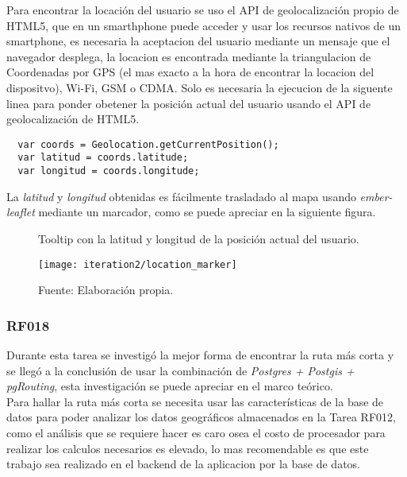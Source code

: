 Para encontrar la locación del usuario se uso el API de geolocalización propio de HTML5, que en un smarthphone puede acceder y usar los recursos nativos de un smartphone, es necesaria la aceptacion del usuario mediante un mensaje que el navegador desplega, la locacion es encontrada mediante la triangulacion de Coordenadas por GPS (el mas exacto a la hora de encontrar la locacion del dispositvo), Wi-Fi, GSM o CDMA. Solo es necesaria la ejecucion de la siguente linea para ponder obetener la posición actual del usuario usando el API de geolocalización de HTML5.

\begin{verbatim}
  var coords = Geolocation.getCurrentPosition();
  var latitud = coords.latitude;
  var longitud = coords.longitude;
\end{verbatim}

La \emph{latitud} y \emph{longitud} obtenidas es fácilmente trasladado al mapa usando \emph{ember-leaflet} mediante un marcador, como se puede apreciar en la siguiente figura.

\begin{figure}[H]
  \begin{center}
    \caption{Tooltip con la latitud y longitud de la posición actual del usuario.}
    \label{fig:location_marker}
    \texttt{[image: iteration2/location\_marker]}
    \caption*{Fuente: Elaboración propia.}
  \end{center}
\end{figure}

\subsubsection{RF018}
\label{subs:RF018}

Durante esta tarea se investigó la mejor forma de encontrar la ruta más corta y se llegó a la conclusión de usar la combinación de \emph{Postgres + Postgis + pgRouting}, esta investigación se puede apreciar en el marco teórico.\\

Para hallar la ruta más corta se necesita usar las características de la base de datos para poder analizar los datos geográficos almacenados en la Tarea RF012, como el análisis que se requiere hacer es caro osea el costo de procesador para realizar los calculos necesarios es elevado, lo mas recomendable es que este trabajo sea realizado en el backend de la aplicacion por la base de datos.\\

